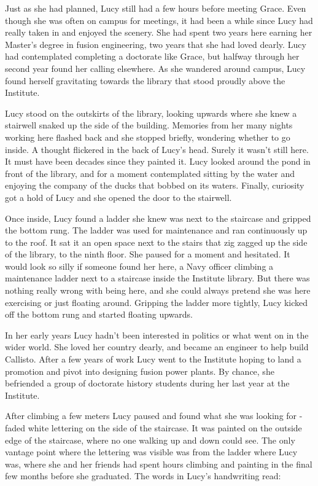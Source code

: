 \documentclass[openany, 12pt]{book} %
\begin{document}
Just as she had planned, Lucy still had a few hours before meeting Grace. Even though she was often on campus for meetings, it had been a while since Lucy had really taken in and enjoyed the scenery. She had spent two years here earning her Master's degree in fusion engineering, two years that she had loved dearly. Lucy had contemplated completing a doctorate like Grace, but halfway through her second year found her calling elsewhere. As she wandered around campus, Lucy found herself gravitating towards the library that stood proudly above the Institute. 

Lucy stood on the outskirts of the library, looking upwards where she knew a stairwell snaked up the side of the building. Memories from her many nights working here flashed back and she stopped briefly, wondering whether to go inside. A thought flickered in the back of Lucy's head. Surely it wasn't still here. It must have been decades since they painted it. Lucy looked around the pond in front of the library, and for a moment contemplated sitting by the water and enjoying the company of the ducks that bobbed on its waters. Finally, curiosity got a hold of Lucy and she opened the door to the stairwell.

Once inside, Lucy found a ladder she knew was next to the staircase and gripped the bottom rung. The ladder was used for maintenance and ran continuously up to the roof. It sat it an open space next to the stairs that zig zagged up the side of the library, to the ninth floor. She paused for a moment and hesitated. It would look so silly if someone found her here, a Navy officer climbing a maintenance ladder next to a staircase inside the Institute library. But there was nothing really wrong with being here, and she could always pretend she was here exercising or just floating around. Gripping the ladder more tightly, Lucy kicked off the bottom rung and started floating upwards.

In her early years Lucy hadn't been interested in politics or what went on in the wider world. She loved her country dearly, and became an engineer to help build Callisto. After a few years of work Lucy went to the Institute hoping to land a promotion and pivot into designing fusion power plants. By chance, she befriended a group of doctorate history students during her last year at the Institute.

After climbing a few meters Lucy paused and found what she was looking for - faded white lettering on the side of the staircase. It was painted on the outside edge of the staircase, where no one walking up and down could see. The only vantage point where the lettering was visible was from the ladder where Lucy was, where she and her friends had spent hours climbing and painting in the final few months before she graduated. The words in Lucy's handwriting read:
\end{document}
